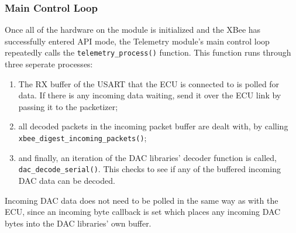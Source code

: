\subsubsection{Main Control Loop}

Once all of the hardware on the module is initialized and the XBee has successfully entered API mode, the Telemetry module's main control loop repeatedly calls the \verb|telemetry_process()| function. This function runs through three seperate processes:
\begin{enumerate}
  \item The RX buffer of the USART that the ECU is connected to is polled for data. If there is any incoming data waiting, send it over the ECU link by passing it to the packetizer;
  \item all decoded packets in the incoming packet buffer are dealt with, by calling\\ \verb|xbee_digest_incoming_packets()|;
  \item and finally, an iteration of the DAC libraries' decoder function is called,\\ \verb|dac_decode_serial()|. This checks to see if any of the buffered incoming DAC data can be decoded.
\end{enumerate}

Incoming DAC data does not need to be polled in the same way as with the ECU, since an incoming byte callback is set which places any incoming DAC bytes into the DAC libraries' own buffer.